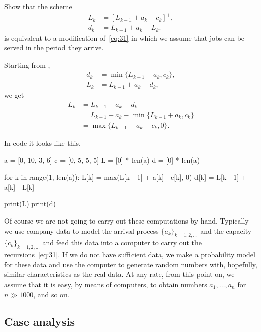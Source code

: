 \begin{exercise}
 Show that the scheme
\begin{equation}\label{eq:5}
 \begin{split}
 L_k &= [L_{k-1}+a_k - c_k]^+,\\
 d_k &= L_{k-1} +a_k- L_{k}.
 \end{split}
\end{equation}
is equivalent to a modification of~\cref{eq:31} in which we assume that jobs can be served in the period they arrive.
\begin{solution}
Starting from ,
 \begin{align*}
 d_k &= \min\{L_{k-1}+a_k, c_k\}, \\
 L_k &= L_{k-1} + a_k - d_k,
 \end{align*}
 we get
 \begin{align*}
 L_k &= L_{k-1} + a_k - d_k \\ 
 &= L_{k-1} + a_k - \min\{L_{k-1}+a_k, c_k\} \\
 &= \max\{L_{k-1} + a_k - c_k, 0 \}.
 \end{align*}

In code it looks like this.
\begin{pyconsole}
a = [0, 10, 3, 6]
c = [0, 5, 5, 5]
L = [0] * len(a)
d = [0] * len(a)

for k in range(1, len(a)):
    L[k] = max(L[k - 1] + a[k] - c[k], 0)
    d[k] = L[k - 1] + a[k] - L[k]


print(L)
print(d)
\end{pyconsole}
 
\end{solution}
\end{exercise}



Of course we are not going to carry out these computations by hand.
Typically we use company data to model the arrival process $\{a_k\}_{k=1,2,\ldots}$ and the capacity $\{c_k\}_{k=1,2,\ldots}$ and feed this data into a computer to carry out the recursions~\cref{eq:31}.
If we do not have sufficient data, we make a probability model for these data and use the computer to generate random numbers with, hopefully, similar characteristics as the real data.
At any rate, from this point on, we assume that it is easy, by means of computers, to obtain numbers $a_1,\ldots, a_n$ for $n\gg 1000$, and so on.


\subsection*{Case analysis}
\label{sec:case-analysis}

